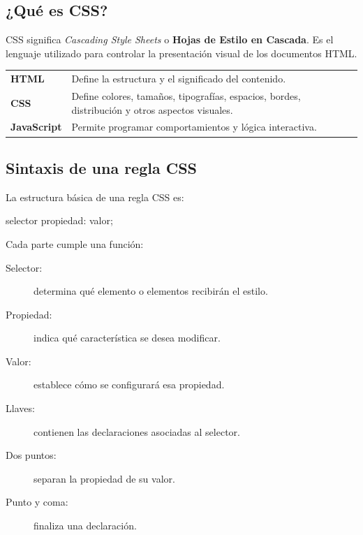 \documentclass[11pt]{article}
\begin{document}
    \subsection{¿Qué es CSS?}

    CSS significa \textit{Cascading Style Sheets} o \textbf{Hojas de Estilo en Cascada}. Es el lenguaje utilizado para controlar la presentación visual de los documentos HTML.

    \begin{center}
        \begin{tabularx}{0.92\textwidth}{>{\bfseries}p{3cm}X}
            \toprule
            HTML & Define la estructura y el significado del contenido. \\
            CSS & Define colores, tamaños, tipografías, espacios, bordes, distribución y otros aspectos visuales. \\
            JavaScript & Permite programar comportamientos y lógica interactiva. \\
            \bottomrule
        \end{tabularx}
    \end{center}


    \subsection{Sintaxis de una regla CSS}

    La estructura básica de una regla CSS es:

    \begin{csscodedark}
        selector {
            propiedad: valor;
        }
    \end{csscodedark}

    Cada parte cumple una función:

    \begin{description}
        \item[Selector:] determina qué elemento o elementos recibirán el estilo.
        \item[Propiedad:] indica qué característica se desea modificar.
        \item[Valor:] establece cómo se configurará esa propiedad.
        \item[Llaves:] contienen las declaraciones asociadas al selector.
        \item[Dos puntos:] separan la propiedad de su valor.
        \item[Punto y coma:] finaliza una declaración.
    \end{description}
\end{document}
